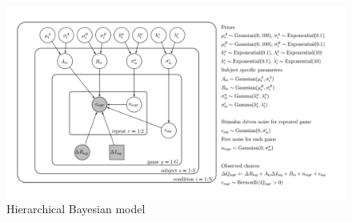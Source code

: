 \documentclass[12pt]{article}
\begin{document}
	\begin{figure}[H]
		\begin{center}
			\includegraphics[width=\textwidth]{figures/Figure3.pdf}
			\caption{Hierarchical Bayesian model}
			\label{fig:model}
		\end{center}
	\end{figure}
	
	
	
	
	
	
	
\end{document}

